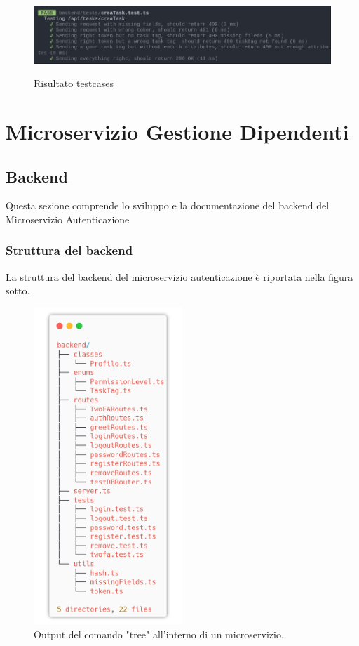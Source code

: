 \documentclass{report}
\begin{document}
\begin{figure}[H]
	\centering\includegraphics[width=1\textwidth]{images/jest_crea_task.png}

	Risultato testcases
\end{figure}


\chapter{Microservizio Gestione Dipendenti}
\section{Backend}

Questa sezione comprende lo sviluppo e la documentazione del backend del Microservizio Autenticazione

\subsection*{Struttura del backend}
La struttura del backend del microservizio autenticazione è riportata
nella figura sotto.
\begin{figure}[H]
	\centering\includegraphics[width=0.5\textwidth]{images/microservizio-autenticazione/backend-structure.png}
	\caption{Output del comando "tree" all'interno di un microservizio.}
\end{figure}
\end{document}
